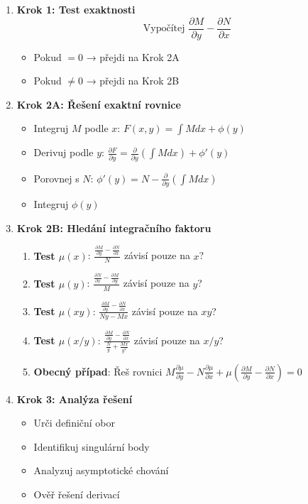\begin{method}
\label{met:decision-tree}
\begin{enumerate}
\item \textbf{Krok 1: Test exaktnosti}
\[
\text{Vypočítej } \frac{\partial M}{\partial y} - \frac{\partial N}{\partial x}
\]
\begin{itemize}
\item Pokud $= 0$ → přejdi na Krok 2A
\item Pokud $\neq 0$ → přejdi na Krok 2B
\end{itemize}

\item \textbf{Krok 2A: Řešení exaktní rovnice}
\begin{itemize}
\item Integruj $M$ podle $x$: $F(x, y) = \int M dx + \phi(y)$
\item Derivuj podle $y$: $\frac{\partial F}{\partial y} = \frac{\partial}{\partial y}(\int M dx) + \phi'(y)$
\item Porovnej s $N$: $\phi'(y) = N - \frac{\partial}{\partial y}(\int M dx)$
\item Integruj $\phi(y)$
\end{itemize}

\item \textbf{Krok 2B: Hledání integračního faktoru}
\begin{enumerate}
\item \textbf{Test $\mu(x)$}: $\frac{\frac{\partial M}{\partial y} - \frac{\partial N}{\partial x}}{N}$ závisí pouze na $x$?
\item \textbf{Test $\mu(y)$}: $\frac{\frac{\partial N}{\partial x} - \frac{\partial M}{\partial y}}{M}$ závisí pouze na $y$?
\item \textbf{Test $\mu(xy)$}: $\frac{\frac{\partial M}{\partial y} - \frac{\partial N}{\partial x}}{Ny - Mx}$ závisí pouze na $xy$?
\item \textbf{Test $\mu(x/y)$}: $\frac{\frac{\partial M}{\partial y} - \frac{\partial N}{\partial x}}{\frac{N}{y} + \frac{Mx}{y^2}}$ závisí pouze na $x/y$?
\item \textbf{Obecný případ}: Řeš rovnici $M\frac{\partial \mu}{\partial y} - N\frac{\partial \mu}{\partial x} + \mu(\frac{\partial M}{\partial y} - \frac{\partial N}{\partial x}) = 0$
\end{enumerate}

\item \textbf{Krok 3: Analýza řešení}
\begin{itemize}
\item Urči definiční obor
\item Identifikuj singulární body
\item Analyzuj asymptotické chování
\item Ověř řešení derivací
\end{itemize}
\end{enumerate}
\end{method}


